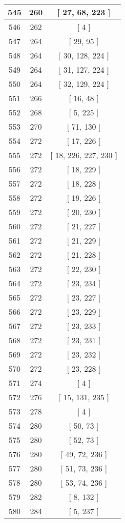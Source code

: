 \begin{center}
\begin{longtable}[H]{|| c c c ||}
545 & 260 & [ 27, 68, 223 ]
\\\hline
546 & 262 & [ 4 ]
\\\hline
547 & 264 & [ 29, 95 ]
\\\hline
548 & 264 & [ 30, 128, 224 ]
\\\hline
549 & 264 & [ 31, 127, 224 ]
\\\hline
550 & 264 & [ 32, 129, 224 ]
\\\hline
551 & 266 & [ 16, 48 ]
\\\hline
552 & 268 & [ 5, 225 ]
\\\hline
553 & 270 & [ 71, 130 ]
\\\hline
554 & 272 & [ 17, 226 ]
\\\hline
555 & 272 & [ 18, 226, 227, 230 ]
\\\hline
556 & 272 & [ 18, 229 ]
\\\hline
557 & 272 & [ 18, 228 ]
\\\hline
558 & 272 & [ 19, 226 ]
\\\hline
559 & 272 & [ 20, 230 ]
\\\hline
560 & 272 & [ 21, 227 ]
\\\hline
561 & 272 & [ 21, 229 ]
\\\hline
562 & 272 & [ 21, 228 ]
\\\hline
563 & 272 & [ 22, 230 ]
\\\hline
564 & 272 & [ 23, 234 ]
\\\hline
565 & 272 & [ 23, 227 ]
\\\hline
566 & 272 & [ 23, 229 ]
\\\hline
567 & 272 & [ 23, 233 ]
\\\hline
568 & 272 & [ 23, 231 ]
\\\hline
569 & 272 & [ 23, 232 ]
\\\hline
570 & 272 & [ 23, 228 ]
\\\hline
571 & 274 & [ 4 ]
\\\hline
572 & 276 & [ 15, 131, 235 ]
\\\hline
573 & 278 & [ 4 ]
\\\hline
574 & 280 & [ 50, 73 ]
\\\hline
575 & 280 & [ 52, 73 ]
\\\hline
576 & 280 & [ 49, 72, 236 ]
\\\hline
577 & 280 & [ 51, 73, 236 ]
\\\hline
578 & 280 & [ 53, 74, 236 ]
\\\hline
579 & 282 & [ 8, 132 ]
\\\hline
580 & 284 & [ 5, 237 ]

\end{longtable}
\end{center}
